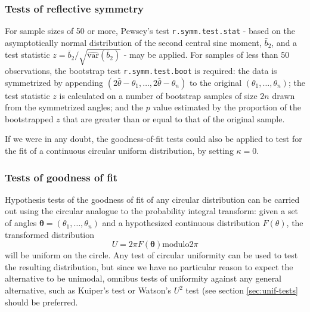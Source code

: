 \documentclass[../../ArchStats.tex]{subfiles}
\begin{document}
\subsubsection{Tests of reflective symmetry}
\label{sec:refl-symmetry}

For sample sizes of 50 or more, Pewsey's test \texttt{r.symm.test.stat} - based on the asymptotically normal distribution of the second central sine moment, $\bar{b}_2$, and a test statistic $z = \bar{b}_2 / \sqrt{\widehat{\text{var}}(\bar{b}_2)}$ \cite{Pewsey2002} - may be applied. For samples of less than 50 observations, the bootstrap test \texttt{r.symm.test.boot} is required: the data is symmetrized by appending $(2\bar{\theta} - \theta_1, \dots, 2\bar{\theta} - \theta_n)$ to the original $(\theta_1, \dots, \theta_n)$; the test statistic $z$ is calculated on a number of bootstrap samples of size $2n$ drawn from the symmetrized angles; and the $p$ value estimated by the proportion of the bootstrapped $z$ that are greater than or equal to that of the original sample.

If we were in any doubt, the goodness-of-fit tests could also be applied to test for the fit of a continuous circular uniform distribution, by setting $\kappa = 0$.


\subsubsection{Tests of goodness of fit}
\label{sec:GoF}

Hypothesis tests of the goodness of fit of any circular distribution can be carried out using the circular analogue to the probability integral transform: given a set of angles $\mathbf{\theta} = (\theta_1, \dots, \theta_n)$ and a hypothesized continuous distribution $F(\theta)$, the transformed distribution
\[U = 2\pi F(\mathbf{\theta}) \text{modulo} 2\pi\]
will be uniform on the circle. Any test of circular uniformity can be used to test the resulting distribution, but since we have no particular reason to expect the alternative to be unimodal, omnibus tests of uniformity against any general alternative, such as Kuiper's test or Watson's $U^2$ test (see section \ref{sec:unif-tests} should be preferred.
\end{document}
